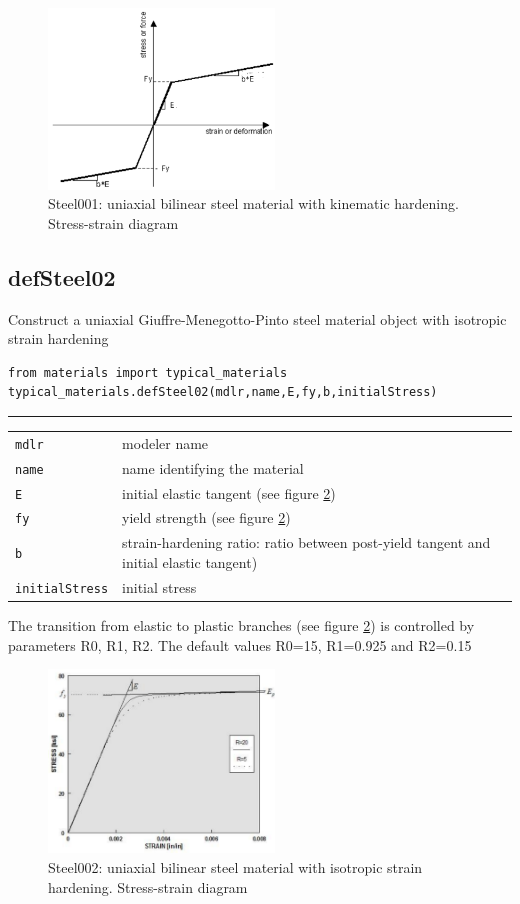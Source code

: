 \begin{figure}[h]
\centering
\includegraphics[width=60mm]{materials/figures/Steel01}
\caption{Steel001: uniaxial bilinear steel material with kinematic hardening. Stress-strain diagram}\label{Steel01}
\end{figure}


\subsection{defSteel02}
\noindent Construct a uniaxial Giuffre-Menegotto-Pinto steel material object with isotropic strain hardening
\begin{verbatim}
from materials import typical_materials
typical_materials.defSteel02(mdlr,name,E,fy,b,initialStress)
\end{verbatim}
\vspace{-10pt}
{\color{grayLines} \rule{\linewidth}{0.25pt}}
\begin{center}
\begin{tabular}{lp{10cm}}
{\tt mdlr} & modeler name \\
{\tt name} & name identifying the material \\
{\tt E} & initial elastic tangent (see figure \ref{Steel02}) \\
{\tt fy} &  yield strength (see figure \ref{Steel02})\\
{\tt b} &  strain-hardening ratio: ratio between post-yield tangent and initial elastic tangent)\\
{\tt initialStress} &  initial stress \\
\end{tabular}
\end{center}
{\footnotesize The transition from elastic to plastic branches  (see figure \ref{Steel02}) is controlled by parameters R0, R1, R2. The default values R0=15, R1=0.925 and R2=0.15}

\begin{figure}[h]
\centering
\includegraphics[width=60mm]{materials/figures/Steel02Monotonic}
\caption{Steel002: uniaxial bilinear steel material with isotropic strain hardening. Stress-strain diagram}\label{Steel02}
\end{figure}

